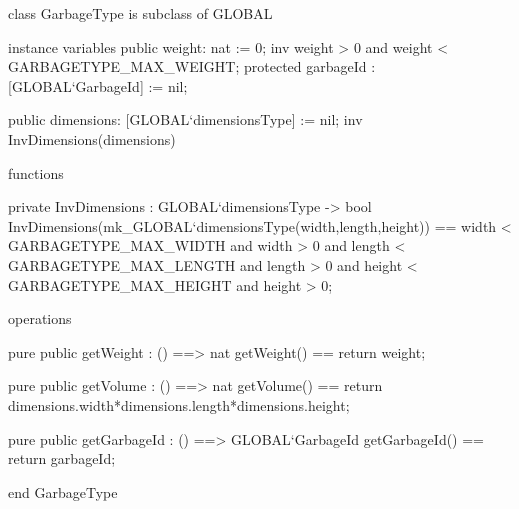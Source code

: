 \documentclass[a4paper]{article}
\begin{document}
\title{}
\author{}
\begin{vdm_al}
class GarbageType is subclass of GLOBAL

instance variables
public weight: nat := 0; 
inv weight > 0 and weight < GARBAGETYPE_MAX_WEIGHT;
protected garbageId : [GLOBAL`GarbageId] := nil;


public dimensions: [GLOBAL`dimensionsType] := nil;
inv InvDimensions(dimensions)

functions

private InvDimensions : GLOBAL`dimensionsType -> bool
InvDimensions(mk_GLOBAL`dimensionsType(width,length,height)) == 
        width < GARBAGETYPE_MAX_WIDTH and width > 0 and   
        length < GARBAGETYPE_MAX_LENGTH and length > 0 and
        height < GARBAGETYPE_MAX_HEIGHT and height > 0;


operations

pure public getWeight : () ==> nat
getWeight() == 
    return weight;

pure public getVolume : () ==> nat
getVolume() ==
    return dimensions.width*dimensions.length*dimensions.height;

pure public getGarbageId : () ==> GLOBAL`GarbageId
getGarbageId() ==
    return garbageId;

end GarbageType
\end{vdm_al}
\end{document}
